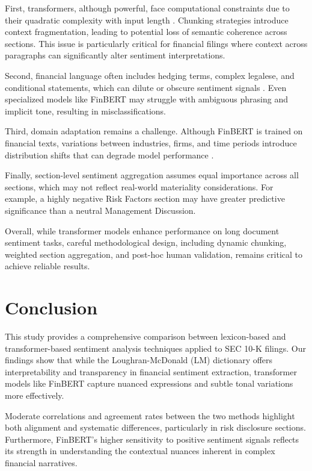\documentclass[12pt]{article}
\begin{document}
First, transformers, although powerful, face computational constraints due to their quadratic complexity with input length \citep{Tay2020}. Chunking strategies introduce context fragmentation, leading to potential loss of semantic coherence across sections. This issue is particularly critical for financial filings where context across paragraphs can significantly alter sentiment interpretations.

Second, financial language often includes hedging terms, complex legalese, and conditional statements, which can dilute or obscure sentiment signals \citep{Loughran2011}. Even specialized models like FinBERT may struggle with ambiguous phrasing and implicit tone, resulting in misclassifications.

Third, domain adaptation remains a challenge. Although FinBERT is trained on financial texts, variations between industries, firms, and time periods introduce distribution shifts that can degrade model performance \citep{Huang2020}.

Finally, section-level sentiment aggregation assumes equal importance across all sections, which may not reflect real-world materiality considerations. For example, a highly negative Risk Factors section may have greater predictive significance than a neutral Management Discussion.

Overall, while transformer models enhance performance on long document sentiment tasks, careful methodological design, including dynamic chunking, weighted section aggregation, and post-hoc human validation, remains critical to achieve reliable results.

\section{Conclusion}
This study provides a comprehensive comparison between lexicon-based and transformer-based sentiment analysis techniques applied to SEC 10-K filings. Our findings show that while the Loughran-McDonald (LM) dictionary offers interpretability and transparency in financial sentiment extraction, transformer models like FinBERT capture nuanced expressions and subtle tonal variations more effectively. 

Moderate correlations and agreement rates between the two methods highlight both alignment and systematic differences, particularly in risk disclosure sections. Furthermore, FinBERT's higher sensitivity to positive sentiment signals reflects its strength in understanding the contextual nuances inherent in complex financial narratives.
\end{document}
